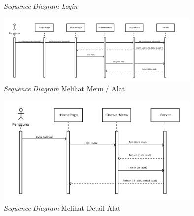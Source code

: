 \begin{flushleft}
\begin{justify}
\begin{enumerate}[label=\alph*.]
\begin{figure}[ht]
                \caption{\textit{Sequence Diagram Login}}
            \end{figure}
            \begin{figure}[ht]
                \centering
                \includegraphics[width=10cm]{images/bab 4/buka menu alat.png}
                \caption{\textit{Sequence Diagram} Melihat Menu / Alat}
            \end{figure}
            \vspace{10cm}
            \begin{figure}[ht]
                \centering
                \includegraphics[width=10cm]{images/bab 4/Sequence buka detail alat.png}
                \caption{\textit{Sequence Diagram} Melihat Detail Alat}
            \end{figure}


\end{enumerate}
\end{justify}
\end{flushleft}
